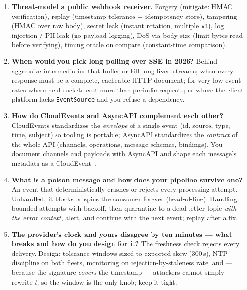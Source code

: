 \begin{enumerate}[label=\textbf{Q\arabic*.}, leftmargin=1.6cm, start=23]
        \texttt{occurred\_at}/sequence transactionally with the effect;
        dedupe on id; make effects last-write-wins on a monotonic cursor or
        buffer-and-reorder within a window; reconcile periodically against
        the provider's pull API (events you \emph{missed} are the silent
        failure mode).
  \item \textbf{Threat-model a public webhook receiver.}
        Forgery (mitigate: HMAC verification), replay (timestamp tolerance +
        idempotency store), tampering (HMAC over raw body), secret leak
        (instant rotation, multiple \texttt{v1}), log injection / PII leak
        (no payload logging), DoS via body size (limit bytes read before
        verifying), timing oracle on compare (constant-time comparison).
  \item \textbf{When would you pick long polling over SSE in 2026?}
        Behind aggressive intermediaries that buffer or kill long-lived
        streams; when every response must be a complete, cacheable HTTP
        document; for very low event rates where held sockets cost more than
        periodic requests; or where the client platform lacks
        \texttt{EventSource} and you refuse a dependency.
  \item \textbf{How do CloudEvents and AsyncAPI complement each other?}
        CloudEvents standardizes the \emph{envelope} of a single event
        (id, source, type, time, subject) so tooling is portable; AsyncAPI
        standardizes the \emph{contract} of the whole API (channels,
        operations, message schemas, bindings). You document channels and
        payloads with AsyncAPI and shape each message's metadata as a
        CloudEvent~\cite{asyncapi}.
  \item \textbf{What is a poison message and how does your pipeline survive
        one?}
        An event that deterministically crashes or rejects every processing
        attempt. Unhandled, it blocks or spins the consumer forever
        (head-of-line). Handling: bounded attempts with backoff, then
        quarantine to a dead-letter topic \emph{with the error context},
        alert, and continue with the next event; replay after a fix.
  \item \textbf{The provider's clock and yours disagree by ten minutes ---
        what breaks and how do you design for it?}
        The freshness check rejects every delivery. Design: tolerance windows
        sized to expected skew (300\,s), NTP discipline on both fleets,
        monitoring on rejection-by-staleness rate, and --- because the
        signature \emph{covers} the timestamp --- attackers cannot simply
        rewrite $t$, so the window is the only knob; keep it tight.
\end{enumerate}

